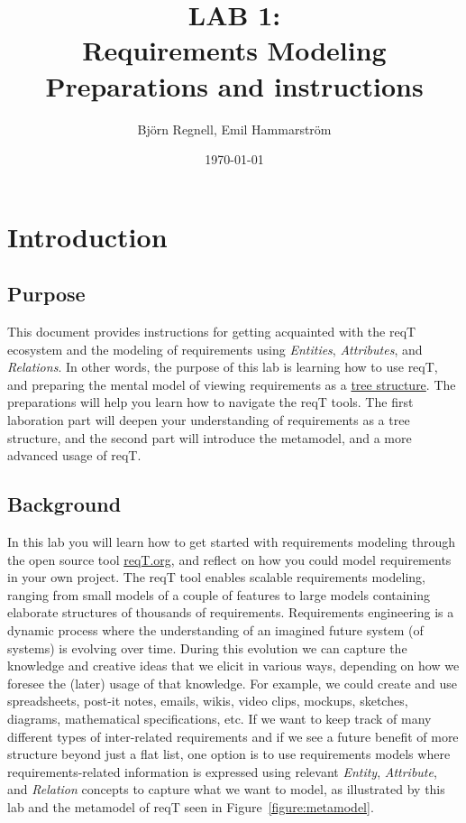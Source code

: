 \documentclass[11pt]{article}
\title{{\bf LAB 1:\\Requirements Modeling}\\ Preparations and instructions}
\author{Björn Regnell, Emil Hammarström}
\date{\today}
\begin{document}
\maketitle

\section{Introduction}

\subsection{Purpose}

This document provides instructions for getting acquainted with the reqT ecosystem and the modeling of requirements using \textit{Entities}, \textit{Attributes}, and \textit{Relations}.
In other words, the purpose of this lab is learning how to use reqT, and preparing the mental model of viewing requirements as a \href{https://en.wikipedia.org/wiki/Tree_(data_structure)}{tree structure}.
The preparations will help you learn how to navigate the reqT tools.
The first laboration part will deepen your understanding of requirements as a tree structure, and the second part will introduce the metamodel, and a more advanced usage of reqT.

\subsection{Background}

In this lab you will learn how to get started with requirements modeling through the open source tool
\href{http://reqT.org}{reqT.org}, and reflect on how you could model requirements in your own project.
The reqT tool enables scalable requirements modeling, ranging from small models of a couple of features to large
models containing elaborate structures of thousands of requirements.
Requirements engineering is a dynamic process where the understanding of an imagined future system
(of systems) is evolving over time.
During this evolution we can capture the knowledge and creative ideas that we elicit in various ways,
depending on how we foresee the (later) usage of that knowledge.
For example, we could create and use spreadsheets, post-it notes, emails, wikis, video clips,
mockups, sketches, diagrams, mathematical specifications, etc.
If we want to keep track of many different types of inter-related requirements and if we see a future benefit
of more structure beyond just a flat list, one option is to use requirements models where requirements-related
information is expressed using relevant \textit{Entity}, \textit{Attribute}, and \textit{Relation} concepts to capture
what we want to model, as illustrated by this lab and the metamodel of reqT seen in Figure~\ref{figure:metamodel}.
\end{document}
